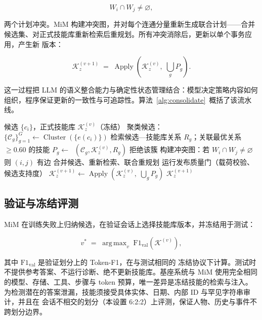 \documentclass[UTF8,11pt]{ctexart}
\newcommand{\KK}{\mathcal{K}}
\newcommand{\CC}{\mathcal{C}}
\DeclareMathOperator*{\argmax}{arg\,max}
\DeclareMathOperator{\Apply}{Apply}
\DeclareMathOperator{\Valid}{Valid}
\DeclareMathOperator{\Cluster}{Cluster}
\DeclareMathOperator{\Crud}{G_{crud}}
\begin{document}
\begin{equation}
\label{eq:conflict}
W_i \cap W_j \neq \varnothing,
\end{equation}

\noindent 两个计划冲突。MiM 构建冲突图，并对每个连通分量重新生成联合计划——合并
候选集、对正式技能库重新检索后重规划。所有冲突消除后，更新以单个事务应用，产生新
版本：

\begin{equation}
\label{eq:release}
\KK_z^{(v+1)} \;=\; \Apply\left(\KK_z^{(v)},\; \bigcup_g P_g\right).
\end{equation}

\noindent 这一过程把 LLM 的语义整合能力与确定性状态管理结合：模型决定策略内容如何
组织，程序保证更新的一致性与可追踪性。算法~\ref{alg:consolidate}~概括了该流水线。

\begin{algorithm}[t]
\caption{整合：候选簇 $\rightarrow$ 新技能库版本}
\label{alg:consolidate}
\begin{algorithmic}[1]
\Require 候选 $\{c_i\}$，正式技能库 $\KK_z^{(v)}$（冻结）
\State 聚类候选：$\{\CC_g\}_{g=1}^{G} \leftarrow \Cluster(\{e(c_i)\})$
\For{每个簇 $\CC_g$}
  \State 检索候选—技能库关系 $R_g$；关联最优关系 $\ge 0.60$ 的技能
  \State $P_g \leftarrow \Crud(\CC_g, \KK_z^{(v)}, R_g)$ 
  \If{$\Valid(P_g, \KK_z^{(v)}) = 0$} \State 拒绝该簇 \EndIf
\EndFor
\Repeat
  \State 构建冲突图：若 $W_i \cap W_j \neq \varnothing$ 则 $(i,j)$ 有边
    \State 合并候选、重新检索、联合重规划
  \EndFor
{}
\State 运行发布质量门（载荷校验、候选支持度）
\State $\KK_z^{(v+1)} \leftarrow \Apply(\KK_z^{(v)},\; \bigcup_g P_g)$
\Return $\KK_z^{(v+1)}$
\end{algorithmic}
\end{algorithm}

\subsection{验证与冻结评测}
\label{sec:method-validation}

MiM 在训练失败上归纳候选，在验证会话上选择技能库版本，并冻结用于测试：

\begin{equation}
\label{eq:select}
v^{*} \;=\; \argmax_{v}\; \mathrm{F1}_{\mathrm{val}}\!\left(\KK^{(v)}\right),
\end{equation}

\noindent 其中 $\mathrm{F1}_{\mathrm{val}}$ 是验证划分上的 Token-F1，在与测试相同的
冻结协议下计算。测试时不提供参考答案、不运行诊断、绝不更新技能库。基座系统与 MiM
使用完全相同的模型、存储、工具、步骤与 token 预算，唯一差异是冻结技能的检索与注入。
为检测潜在的答案泄漏，技能须接受具体实体、日期、内部 ID 与罕见字符串审计，并且在
会话不相交的划分（本设置 6:2:2）上评测，保证人物、历史与事件不跨划分边界。
\end{document}
